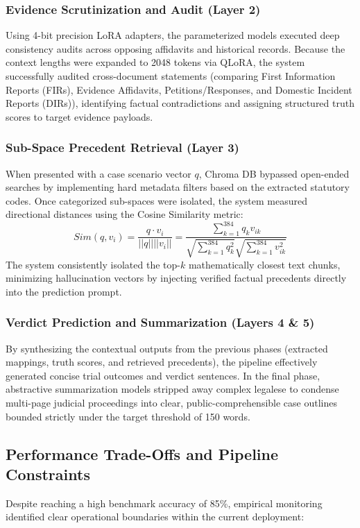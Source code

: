 \subsubsection{Evidence Scrutinization and Audit (Layer 2)}
Using 4-bit precision LoRA adapters, the parameterized models executed deep consistency audits across opposing affidavits and historical records. Because the context lengths were expanded to 2048 tokens via QLoRA, the system successfully audited cross-document statements (comparing First Information Reports (FIRs), Evidence Affidavits, Petitions/Responses, and Domestic Incident Reports (DIRs)), identifying factual contradictions and assigning structured truth scores to target evidence payloads.

\subsubsection{Sub-Space Precedent Retrieval (Layer 3)}
When presented with a case scenario vector $q$, Chroma DB bypassed open-ended searches by implementing hard metadata filters based on the extracted statutory codes. Once categorized sub-spaces were isolated, the system measured directional distances using the Cosine Similarity metric:
\begin{equation}
	Sim(q,v_{i})=\frac{q\cdot v_{i}}{||q||||v_{i}||}=\frac{\sum_{k=1}^{384}q_{k}v_{ik}}{\sqrt{\sum_{k=1}^{384}q_{k}^{2}}\sqrt{\sum_{k=1}^{384}v_{ik}^{2}}} \text{}
\end{equation}
The system consistently isolated the top-$k$ mathematically closest text chunks, minimizing hallucination vectors by injecting verified factual precedents directly into the prediction prompt.

\subsubsection{Verdict Prediction and Summarization (Layers 4 \& 5)}
By synthesizing the contextual outputs from the previous phases (extracted mappings, truth scores, and retrieved precedents), the pipeline effectively generated concise trial outcomes and verdict sentences. In the final phase, abstractive summarization models stripped away complex legalese to condense multi-page judicial proceedings into clear, public-comprehensible case outlines bounded strictly under the target threshold of 150 words.

\subsection{Performance Trade-Offs and Pipeline Constraints}
Despite reaching a high benchmark accuracy of 85\%, empirical monitoring identified clear operational boundaries within the current deployment:

